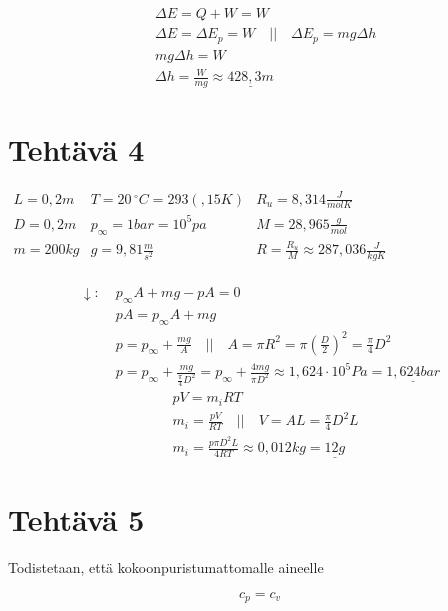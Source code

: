 \documentclass[12pt,a4paper,finnish]{article}
\begin{document}
\begin{align}
 &\Delta E = Q + W = W\\
 &\Delta E = \Delta E_p = W \quad\bigg|\bigg|\quad \Delta E_p = mg\Delta h\\
 &mg\Delta h = W\\
 &\Delta h = \frac{W}{mg} \approx \underline{428,3 m}
\end{align}

\section{Tehtävä 4}

\begin{math}
 \begin{array}{lll}
  L = 0,2m & T = 20\,^{\circ}C = 293(,15K )
    & R_u = 8,314\frac{J}{molK}\\
  D = 0,2m&p_\infty = 1 bar = 10^5 pa & M = 28,965\frac{g}{mol}\\
  m = 200kg  & g = 9,81 \frac{m}{s^2}& R = \frac{R_u}{M} \approx 287,036 \frac{J}{kgK}\\
 \end{array}
\end{math}

\begin{align}
 \downarrow: \; &p_\infty A + mg - pA = 0\\
 &pA = p_\infty A + mg\\
 &p = p_\infty + \frac{mg}{A} \quad\bigg|\bigg|\quad A = \pi R^2 = \pi \left(\frac{D}{2}\right)^2 = \frac{\pi}{4}D^2\\
 &p = p_\infty + \frac{mg}{\frac{\pi}{4}D^2} = p_\infty + \frac{4mg}{\pi D^2} 
  \approx 1,624\cdot10^5Pa = \underline{1,624 bar}
\end{align}
\begin{align}
 &pV = m_iRT\\
 &m_i = \frac{pV}{RT} \quad\bigg|\bigg|\quad V = AL = \frac{\pi}{4}D^2L\\
 &m_i = \frac{p\pi D^2L}{4RT} \approx 0,012kg = \underline{12g}
\end{align}

\section{Tehtävä 5} \label{t:5}

Todistetaan, että kokoonpuristumattomalle aineelle

\begin{framed}
 \begin{equation}
  c_p = c_v
 \end{equation}
\end{framed}
\end{document}
